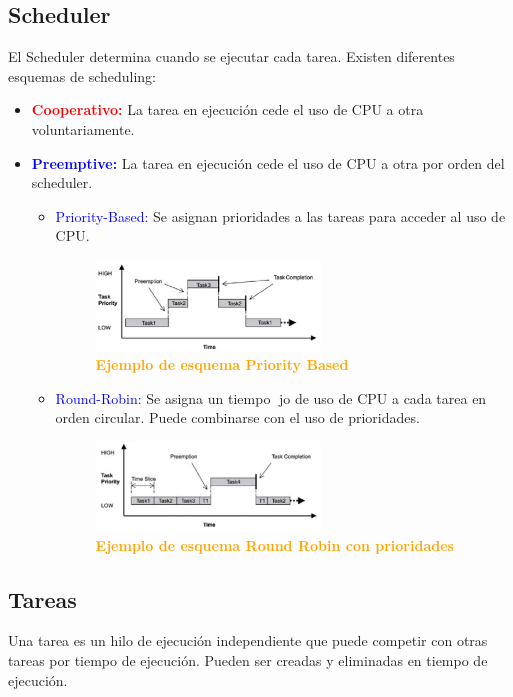 \documentclass{article}
\begin{document}
\subsection{Scheduler}
El Scheduler determina cuando se ejecutar cada tarea. Existen diferentes esquemas de scheduling:\\
\begin{itemize}
\item \textbf{\textcolor{red}{Cooperativo:}} La tarea en ejecución cede el uso de CPU a otra voluntariamente.
\item \textbf{\textcolor{blue}{Preemptive:}} La tarea en ejecución cede el uso de CPU a otra por orden del scheduler.
\begin{itemize}
\item{\textcolor{blue}{Priority-Based:} Se asignan prioridades a las tareas para acceder al uso de CPU.
\begin{figure}[H]
   \centering
   \includegraphics[width=0.6\textwidth]{figures/sch1.jpg}
   \centering
   \caption{\textbf{\textcolor{Orange}{Ejemplo de esquema Priority Based}}}
\end{figure}
}

\item{\textcolor{blue}{Round-Robin:} Se asigna un tiempo jo de uso de CPU a cada tarea en orden circular. Puede combinarse con el uso de prioridades.
\begin{figure}[H]
   \centering
   \includegraphics[width=0.6\textwidth]{figures/sch2.jpg}
   \centering
   \caption{\textbf{\textcolor{Orange}{Ejemplo de esquema Round Robin con prioridades}}}
\end{figure}
}
\end{itemize}
\end{itemize}


\subsection{Tareas}
Una tarea es un hilo de ejecución independiente que puede competir con otras tareas por tiempo de ejecución. Pueden ser creadas y eliminadas en tiempo de ejecución.\\
\end{document}
